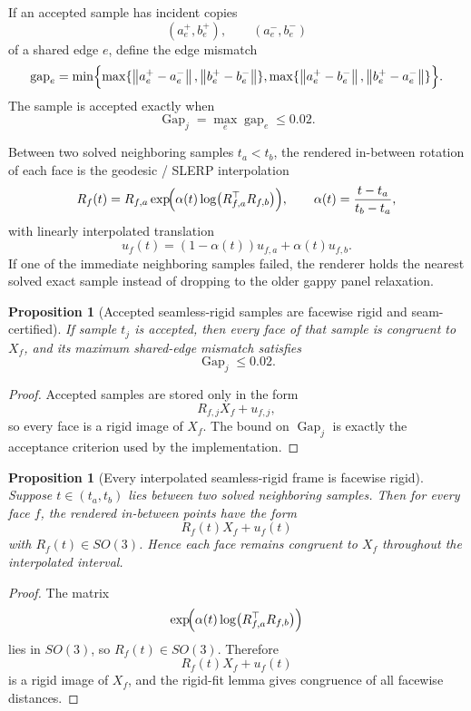 \documentclass[11pt]{article}
\newtheorem{proposition}[definition]{Proposition}
\theoremstyle{remark}
\newcommand{\norm}[1]{\left\lVert #1 \right\rVert}
\begin{document}
If an accepted sample has incident copies
\[
(a_e^+,b_e^+),
\qquad
(a_e^-,b_e^-)
\]
of a shared edge $e$, define the edge mismatch
\[
\operatorname{gap}_e
=
\min\Bigl\{
\max\{\norm{a_e^+-a_e^-},\norm{b_e^+-b_e^-}\},
\max\{\norm{a_e^+-b_e^-},\norm{b_e^+-a_e^-}\}
\Bigr\}.
\]
The sample is accepted exactly when
\[
\operatorname{Gap}_j
=
\max_e\operatorname{gap}_e
\le 0.02.
\]

Between two solved neighboring samples $t_a<t_b$, the rendered in-between
rotation of each face is the geodesic / SLERP interpolation
\[
R_f(t)
=
R_{f,a}
\exp\!\Bigl(
\alpha(t)\log\bigl(R_{f,a}^{\top}R_{f,b}\bigr)
\Bigr),
\qquad
\alpha(t)=\frac{t-t_a}{t_b-t_a},
\]
with linearly interpolated translation
\[
u_f(t)
=
(1-\alpha(t))u_{f,a}+\alpha(t)u_{f,b}.
\]
If one of the immediate neighboring samples failed, the renderer holds the
nearest solved exact sample instead of dropping to the older gappy panel
relaxation.

\begin{proposition}[Accepted seamless-rigid samples are facewise rigid and seam-certified]
If sample $t_j$ is accepted, then every face of that sample is congruent to
$X_f$, and its maximum shared-edge mismatch satisfies
\[
\operatorname{Gap}_j\le 0.02.
\]
\end{proposition}

\begin{proof}
Accepted samples are stored only in the form
\[
R_{f,j}X_f+u_{f,j},
\]
so every face is a rigid image of $X_f$. The bound on $\operatorname{Gap}_j$
is exactly the acceptance criterion used by the implementation.
\end{proof}

\begin{proposition}[Every interpolated seamless-rigid frame is facewise rigid]
Suppose $t\in(t_a,t_b)$ lies between two solved neighboring samples. Then for
every face $f$, the rendered in-between points have the form
\[
R_f(t)X_f+u_f(t)
\]
with $R_f(t)\in SO(3)$. Hence each face remains congruent to $X_f$ throughout
the interpolated interval.
\end{proposition}

\begin{proof}
The matrix
\[
\exp\!\Bigl(
\alpha(t)\log\bigl(R_{f,a}^{\top}R_{f,b}\bigr)
\Bigr)
\]
lies in $SO(3)$, so $R_f(t)\in SO(3)$. Therefore
\[
R_f(t)X_f+u_f(t)
\]
is a rigid image of $X_f$, and the rigid-fit lemma gives congruence of all
facewise distances.
\end{proof}
\end{document}

